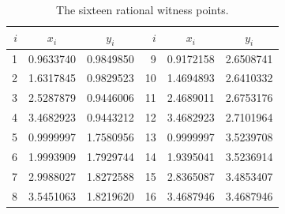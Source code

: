 \documentclass[11pt]{article}
\theoremstyle{definition}
\theoremstyle{remark}
\begin{document}
\begin{table}[t]
\centering
\caption{The sixteen rational witness points.}
\label{tab:points}
\small
\setlength{\tabcolsep}{8pt}
\begin{tabular}{rcc@{\qquad}rcc}
\toprule
$i$ & $x_i$ & $y_i$ & $i$ & $x_i$ & $y_i$\\
\midrule
 1 & 0.9633740 & 0.9849850 &  9 & 0.9172158 & 2.6508741\\
 2 & 1.6317845 & 0.9829523 & 10 & 1.4694893 & 2.6410332\\
 3 & 2.5287879 & 0.9446006 & 11 & 2.4689011 & 2.6753176\\
 4 & 3.4682923 & 0.9443212 & 12 & 3.4682923 & 2.7101964\\
 5 & 0.9999997 & 1.7580956 & 13 & 0.9999997 & 3.5239708\\
 6 & 1.9993909 & 1.7929744 & 14 & 1.9395041 & 3.5236914\\
 7 & 2.9988027 & 1.8272588 & 15 & 2.8365087 & 3.4853407\\
 8 & 3.5451063 & 1.8219620 & 16 & 3.4687946 & 3.4687946\\
\bottomrule
\end{tabular}
\end{table}
\end{document}
